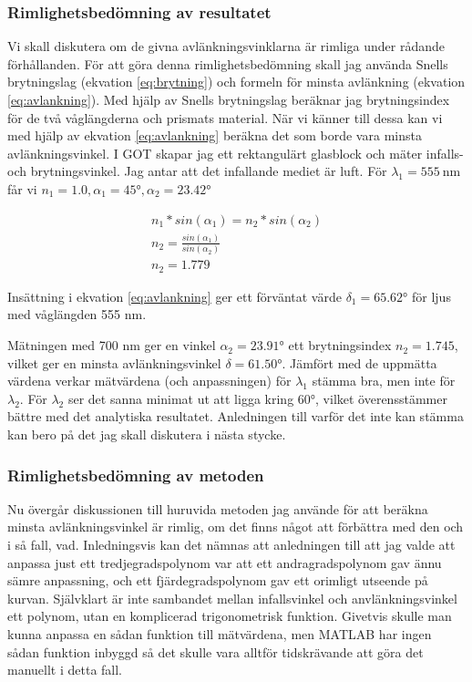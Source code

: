 \documentclass[a4paper]{article}
\begin{document}
\subsubsection{Rimlighetsbedömning av resultatet}
Vi skall diskutera om de givna avlänkningsvinklarna är rimliga under rådande förhållanden. För att göra denna rimlighetsbedömning skall
jag använda Snells brytningslag (ekvation \ref{eq:brytning}) och formeln för minsta avlänkning (ekvation \ref{eq:avlankning}). Med hjälp
av Snells brytningslag beräknar jag brytningsindex för de två våglängderna och prismats material. När vi känner till dessa kan vi med hjälp
av ekvation \ref{eq:avlankning} beräkna det som borde vara minsta avlänkningsvinkel. I GOT skapar jag ett rektangulärt glasblock och mäter
infalls- och brytningsvinkel. Jag antar att det infallande mediet är luft. För $\lambda_1=\SI{555}{\nano\meter}$ får vi $n_1 = 1.0, \alpha_1 = \ang{45}, \alpha_2 = \ang{23.42}$

\begin{equation}
    \begin{aligned}
        n_1 * sin(\alpha_1) = n_2 * sin(\alpha_2) \\
        n_2 = \frac{sin(\alpha_1)}{sin(\alpha_2)} \\
        n_2 = 1.779
    \end{aligned}
\end{equation}

Insättning i ekvation \ref{eq:avlankning} ger ett förväntat värde $\delta_1 = \ang{65.62}$ för ljus med våglängden 555 nm.

Mätningen med 700 nm ger en vinkel $\alpha_2 = \ang{23.91}$ ett brytningsindex $n_2 = 1.745$, vilket ger en minsta avlänkningsvinkel
$\delta = \ang{61.50}$. Jämfört med de uppmätta värdena verkar mätvärdena (och anpassningen) för $\lambda_1$ stämma bra,
men inte för $\lambda_2$. För $\lambda_2$ ser det sanna minimat ut att ligga kring \ang{60}, vilket överensstämmer bättre med det analytiska
resultatet. Anledningen till varför det inte kan stämma kan bero på det jag skall diskutera i nästa stycke.

\subsubsection{Rimlighetsbedömning av metoden}
Nu övergår diskussionen till huruvida metoden jag använde för att beräkna minsta avlänkningsvinkel är rimlig, om det finns något
att förbättra med den och i så fall, vad. Inledningsvis kan det nämnas att anledningen till att jag valde att anpassa just ett tredjegradspolynom
var att ett andragradspolynom gav ännu sämre anpassning, och ett fjärdegradspolynom gav ett orimligt utseende på kurvan. Självklart är inte sambandet
mellan infallsvinkel och anvlänkningsvinkel ett polynom, utan en komplicerad trigonometrisk funktion. Givetvis skulle man kunna anpassa
en sådan funktion till mätvärdena, men MATLAB har ingen sådan funktion inbyggd så det skulle vara alltför tidskrävande att göra det manuellt i detta fall.
\end{document}
